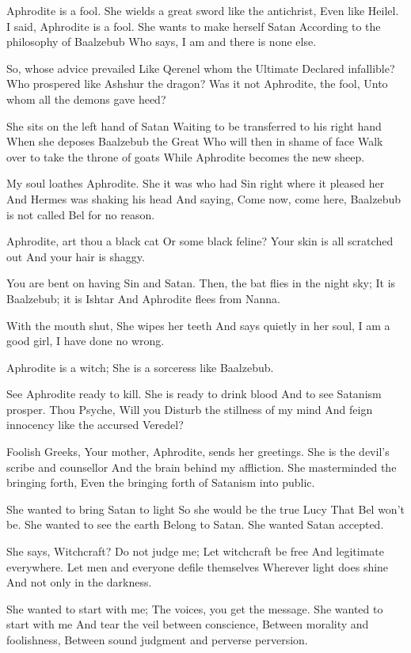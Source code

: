 \documentclass[
]{book}
\begin{document}
Aphrodite is a fool.
She wields a great sword like the antichrist,
Even like Heilel.
I said, Aphrodite is a fool.
She wants to make herself Satan
According to the philosophy of Baalzebub
Who says, I am and there is none else.

So, whose advice prevailed
Like Qerenel whom the Ultimate
Declared infallible?
Who prospered like Ashshur the dragon?
Was it not Aphrodite, the fool,
Unto whom all the demons gave heed?

She sits on the left hand of Satan
Waiting to be transferred to his right hand
When she deposes Baalzebub the Great
Who will then in shame of face
Walk over to take the throne of goats
While Aphrodite becomes the new sheep.

My soul loathes Aphrodite.
She it was who had Sin right where it pleased her
And Hermes was shaking his head
And saying, Come now, come here,
Baalzebub is not called Bel for no reason.

Aphrodite, art thou a black cat
Or some black feline?
Your skin is all scratched out
And your hair is shaggy.

You are bent on having Sin and Satan.
Then, the bat flies in the night sky;
It is Baalzebub; it is Ishtar
And Aphrodite flees from Nanna.

With the mouth shut,
She wipes her teeth
And says quietly in her soul,
I am a good girl, I have done no wrong.

Aphrodite is a witch;
She is a sorceress like Baalzebub.

See Aphrodite ready to kill.
She is ready to drink blood
And to see Satanism prosper.
Thou Psyche, Will you
Disturb the stillness of my mind
And feign innocency like the accursed Veredel?

Foolish Greeks,
Your mother, Aphrodite, sends her greetings.
She is the devil's scribe and counsellor
And the brain behind my affliction.
She masterminded the bringing forth,
Even the bringing forth of Satanism into public.

She wanted to bring Satan to light
So she would be the true Lucy
That Bel won't be.
She wanted to see the earth
Belong to Satan.
She wanted Satan accepted.

She says, Witchcraft? Do not judge me;
Let witchcraft be free
And legitimate everywhere.
Let men and everyone defile themselves
Wherever light does shine
And not only in the darkness.

She wanted to start with me;
The voices, you get the message.
She wanted to start with me
And tear the veil between conscience,
Between morality and foolishness,
Between sound judgment and perverse perversion.
\end{document}
